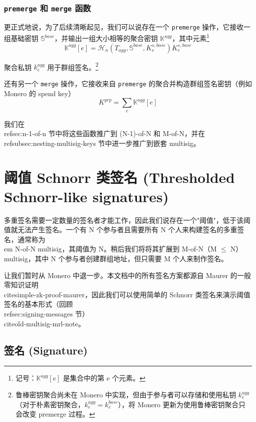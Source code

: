 \subsubsection*{{\tt premerge} 和 {\tt merge} 函数}

更正式地说，为了后续清晰起见，我们可以说存在一个 {\tt premerge} 操作，它接收一组基础密钥 $\mathbb{S}^{base}$，并输出一组大小相等的聚合密钥 $\mathbb{K}^{agg}$，其中元素\footnote{记号：$\mathbb{K}^{agg}[e]$ 是集合中的第 e 个元素。}
\[\mathbb{K}^{agg}[e] = \mathcal{H}_n(T_{agg},\mathbb{S}^{base},K^{s,base}_e)K^{s,base}_e\]

聚合私钥 $k^{agg}_e$ 用于群组签名。\footnote{鲁棒密钥聚合尚未在 Monero 中实现，但由于参与者可以存储和使用私钥 $k^{agg}_e$（对于朴素密钥聚合，$k^{agg}_e = k^{base}_e$），将 Monero 更新为使用鲁棒密钥聚合只会改变 premerge 过程。}

还有另一个 {\tt merge} 操作，它接收来自 {\tt premerge} 的聚合并构造群组签名密钥（例如 Monero 的 spend key）\vspace{.175cm}
\[K^{grp} = \sum_e \mathbb{K}^{agg}[e]\]

我们在 \\ref{sec:n-1-of-n} 节中将这些函数推广到 (N-1)-of-N 和 M-of-N，并在 \\ref{subsec:nesting-multisig-keys} 节中进一步推广到嵌套 multisig。


\section{阈值 Schnorr 类签名 (Thresholded Schnorr-like signatures)}
\label{sec:threshold-schnorr}

多重签名需要一定数量的签名者才能工作，因此我们说存在一个"阈值"，低于该阈值就无法产生签名。一个有 N 个参与者且需要所有 N 个人来构建签名的多重签名，通常称为 {\\em N-of-N multisig}，其阈值为 N。稍后我们将将其扩展到 M-of-N（M $\leq$ N）multisig，其中 N 个参与者创建群组地址，但只需要 M 个人来制作签名。

让我们暂时从 Monero 中退一步。本文档中的所有签名方案都源自 Maurer 的一般零知识证明 \\cite{simple-zk-proof-maurer}，因此我们可以使用简单的 Schnorr 类签名来演示阈值签名的基本形式（回顾 \\ref{sec:signing-messages} 节）\\cite{old-multisig-mrl-note}。


\subsection*{签名 (Signature)}

